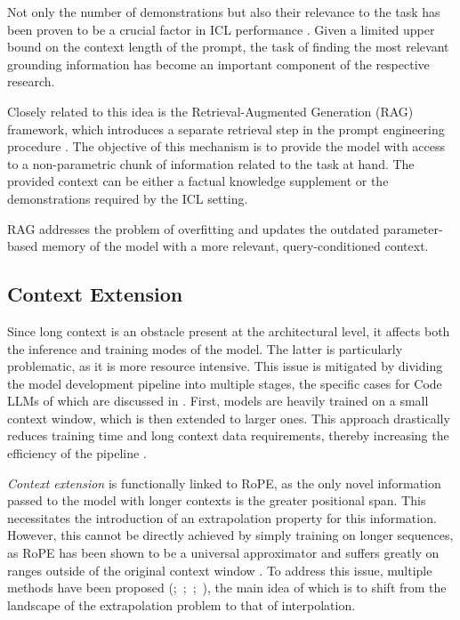 Not only the number of demonstrations but also their relevance to the task has been proven to be a crucial factor in ICL performance \parencite{liu2021}. Given a limited upper bound on the context length of the prompt, the task of finding the most relevant grounding information has become an important component of the respective research.

Closely related to this idea is the Retrieval-Augmented Generation (RAG) framework, which introduces a separate retrieval step in the prompt engineering procedure \parencite{lewis2020}. The objective of this mechanism is to provide the model with access to a non-parametric chunk of information related to the task at hand. The provided context can be either a factual knowledge supplement or the demonstrations required by the ICL setting.

\begin{sloppypar}
RAG addresses the problem of overfitting and updates the outdated parameter-based memory of the model with a more relevant, query-conditioned context.
\end{sloppypar}

\subsection{Context Extension}

Since long context is an obstacle present at the architectural level, it affects both the inference and training modes of the model. The latter is particularly problematic, as it is more resource intensive. This issue is mitigated by dividing the model development pipeline into multiple stages, the specific cases for Code LLMs of which are discussed in . First, models are heavily trained on a small context window, which is then extended to larger ones. This approach drastically reduces training time and long context data requirements, thereby increasing the efficiency of the pipeline \parencite{xiong2023}.

\textit{Context extension} is functionally linked to RoPE, as the only novel information passed to the model with longer contexts is the greater positional span. This necessitates the introduction of an extrapolation property for this information. However, this cannot be directly achieved by simply training on longer sequences, as RoPE has been shown to be a universal approximator and suffers greatly on ranges outside of the original context window \parencite{chen2023}. To address this issue, multiple methods have been proposed (\cite{chen2023};~\cite{rozière2023};~\cite{peng2023};~\cite{xiong2023}), the main idea of which is to shift from the landscape of the extrapolation problem to that of interpolation.

